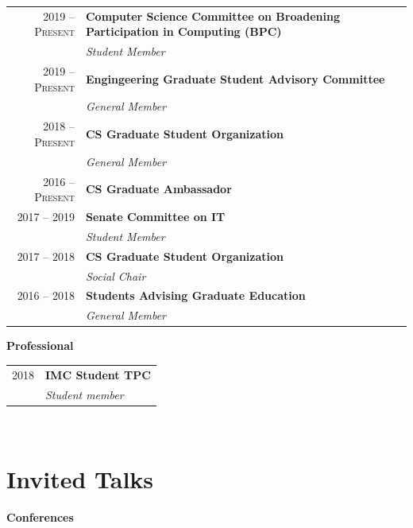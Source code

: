 \documentclass[10pt,singlecolumn]{article} %
\begin{document}
\begin{tabular}{rl}
2019 -- \textsc{Present} & \textbf{Computer Science Committee on Broadening Participation in Computing (BPC)} \\
& \emph{Student Member} \\

2019 -- \textsc{Present} & \textbf{Engingeering Graduate Student Advisory Committee}\\
& \emph{General Member} \\

2018 -- \textsc{Present} & \textbf{CS Graduate Student Organization}\\
& \emph{General Member} \\

2016 -- \textsc{Present} & \textbf{CS Graduate Ambassador}\\

2017 -- 2019 & \textbf{Senate Committee on IT} \\
& \emph{Student Member} \\

2017 -- 2018 & \textbf{CS Graduate Student Organization}\\
& \emph{Social Chair} \\

2016 -- 2018 & \textbf{Students Advising Graduate Education}\\
& \emph{General Member} \\

\end{tabular} 

\vspace{0.3cm}
\textbf{Professional}\\

\begin{tabular}{rl}
2018 & \textbf{IMC Student TPC} \\
& \emph{Student member}\\
\end{tabular} \\


\section{Invited Talks} 

\textbf{Conferences}\\
\end{document}
